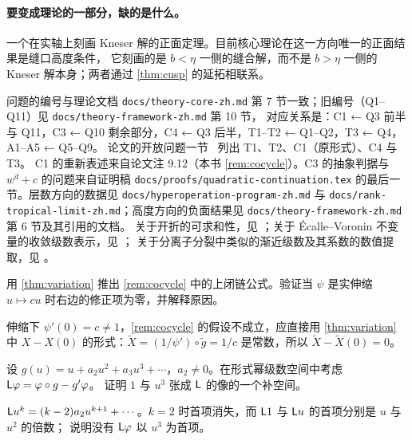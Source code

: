 \paragraph{要变成理论的一部分，缺的是什么。}一个在实轴上刻画 Kneser 解的正面定理。目前核心理论在这一方向唯一的正面结果是缝口高度条件，
它刻画的是 $b<\eta$ 一侧的缝合解，而不是 $b>\eta$ 一侧的 Kneser 解本身；两者通过 \cref{thm:cusp} 的延拓相联系。

\notes

{\sloppy
问题的编号与理论文档 \texttt{docs/theory-core-zh.md} 第 7 节一致；旧编号（Q1--Q11）见 \texttt{docs/theory-framework-zh.md} 第 10 节，
对应关系是：C1 ← Q3 前半与 Q11，C3 ← Q10 剩余部分，C4 ← Q3 后半，T1--T2 ← Q1--Q2，T3 ← Q4，A1--A5 ← Q5--Q9。
论文的开放问题一节~\cite[第~12~节]{KneserPaper} 列出 T1、T2、C1（原形式）、C4 与 T3。
C1 的重新表述来自论文注 9.12（本书 \cref{rem:cocycle}）。C3 的抽象判据与 $w^d+c$ 的问题来自证明稿
\texttt{docs/proofs/quadratic-continuation.tex} 的最后一节。层数方向的数据见 \texttt{docs/hyperoperation-program-zh.md}
与 \texttt{docs/rank-tropical-limit-zh.md}；高度方向的负面结果见 \texttt{docs/theory-framework-zh.md} 第 6 节及其引用的文档。
关于开折的可求和性，见 \cite{MRR2004,ChristopherRousseau,Ribon2010}；关于 Écalle--Voronin 不变量的收敛级数表示，见 \cite{DudkoSauzin2014}；
关于分离子分裂中类似的渐近级数及其系数的数值提取，见 \cite{GelfreichBrannstrom,GelfreichSimo2008}。
\par}

\exercises

\begin{exercise}\label{ch12:ex:cocycle}
用 \cref{thm:variation} 推出 \cref{rem:cocycle} 中的上闭链公式。验证当 $\psi$ 是实伸缩 $u\mapsto cu$ 时右边的修正项为零，并解释原因。
\end{exercise}
\begin{hint}
伸缩下 $\psi'(0)=c\neq1$，\cref{rem:cocycle} 的假设不成立，应直接用 \cref{thm:variation} 中 $X-X(0)$ 的形式：$\tilde X=(1/\psi')\circ\tilde g=1/c$ 是常数，所以 $\tilde X-\tilde X(0)=0$。
\end{hint}

\begin{exercise}\label{ch12:ex:coker}
设 $g(u)=u+a_2u^2+a_3u^3+\cdots$，$a_2\neq0$。在形式幂级数空间中考虑 $\mathsf L\varphi=\varphi\circ g-g'\varphi$。
证明 $1$ 与 $u^3$ 张成 $\mathsf L$ 的像的一个补空间。
\end{exercise}
\begin{hint}
$\mathsf L u^k=(k-2)a_2u^{k+1}+\cdots$。$k=2$ 时首项消失，而 $\mathsf L1$ 与 $\mathsf L u$ 的首项分别是 $u$ 与 $u^2$ 的倍数；
说明没有 $\mathsf L\varphi$ 以 $u^3$ 为首项。
\end{hint}

